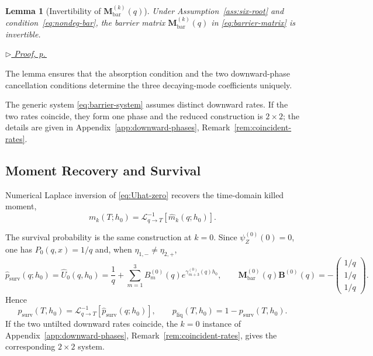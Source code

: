 \documentclass[11pt]{article}
\newcommand{\proofref}[1]{%
  \par\noindent\hfill{\small\itshape\hyperref[#1]{$\triangleright$ Proof, p.\,\pageref{#1}}}}
\theoremstyle{plain}
\newtheorem{lemma}[theorem]{Lemma}
\theoremstyle{definition}
\theoremstyle{remark}
\begin{document}
\begin{lemma}[Invertibility of $\mathbf{M}_{\mathrm{bar}}^{(k)}(q)$]\label{lem:Mbar-inv}
Under Assumption~\ref{ass:six-root} and condition~\eqref{eq:nondeg-bar}, the barrier matrix
$\mathbf{M}_{\mathrm{bar}}^{(k)}(q)$ in \eqref{eq:barrier-matrix} is invertible.
\end{lemma}
\proofref{proof:lem:Mbar-inv}

The lemma ensures that the absorption condition and the two downward-phase cancellation
conditions determine the three decaying-mode coefficients uniquely.

The generic system \eqref{eq:barrier-system} assumes distinct downward rates. If the two
rates coincide, they form one phase and the reduced construction is $2\times2$; the details
are given in Appendix~\ref{app:downward-phases}, Remark~\ref{rem:coincident-rates}.

\subsection{Moment Recovery and Survival}

Numerical Laplace inversion of \eqref{eq:Uhat-zero} recovers the time-domain killed moment,
\begin{equation}\label{eq:moment-inversion}
m_k(T;h_0)=\mathcal L^{-1}_{q\to T}\!\left[\widehat m_k(q;h_0)\right].
\end{equation}

The survival probability is the same construction at $k=0$. Since
$\psi_Z^{(0)}(0)=0$, one has $P_0(q,x)=1/q$ and, when
$\eta_{1,-}\neq\eta_{2,+}$,
\begin{equation}\label{eq:survival-transform}
\widehat p_{\mathrm{surv}}(q;h_0)
=\widehat U_0(q,h_0)
=\frac{1}{q}
+\sum_{m=1}^3 B_m^{(0)}(q)e^{\gamma_{m+3}^{(0)}(q)h_0},
\qquad
\mathbf{M}_{\mathrm{bar}}^{(0)}(q)\mathbf{B}^{(0)}(q)
=-\begin{pmatrix}1/q\\1/q\\1/q\end{pmatrix}.
\end{equation}
Hence
\[
p_{\mathrm{surv}}(T,h_0)
=\mathcal L^{-1}_{q\to T}\!\left[\widehat p_{\mathrm{surv}}(q;h_0)\right],
\qquad
p_{\mathrm{liq}}(T,h_0)=1-p_{\mathrm{surv}}(T,h_0).
\]
If the two untilted downward rates coincide, the $k=0$ instance of
Appendix~\ref{app:downward-phases}, Remark~\ref{rem:coincident-rates}, gives the corresponding
$2\times2$ system.


\end{document}
